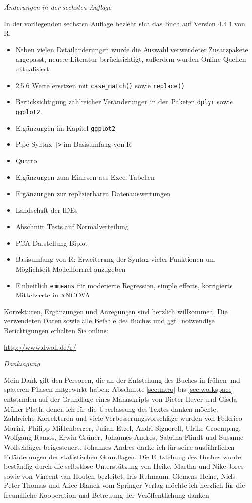 \textit{Änderungen in der sechsten Auflage}

In der vorliegenden sechsten Auflage bezieht sich das Buch auf Version 4.4.1 von R. 
\begin{itemize}
\item Neben vielen Detailänderungen wurde die Auswahl verwendeter Zusatzpakete angepasst, neuere Literatur berücksichtigt, außerdem wurden Online-Quellen aktualisiert.
\item 2.5.6 Werte ersetzen mit \lstinline!case_match()! sowie \lstinline!replace()!
\item Berücksichtigung zahlreicher Veränderungen in den Paketen \lstinline!dplyr! sowie \lstinline!ggplot2!.
\item Ergänzungen im Kapitel \lstinline!ggplot2!
\item Pipe-Syntax \lstinline!|>! im Basisumfang von R
\item Quarto
\item Ergänzungen zum Einlesen aus Excel-Tabellen
\item Ergänzungen zur replizierbaren Datenauswertungen
\item Landschaft der IDEs
\item Abschnitt Tests auf Normalverteilung
\item PCA Darstellung Biplot
\item Basisumfang von R: Erweiterung der Syntax vieler Funktionen um Möglichkeit Modellformel anzugeben
\item Einheitlich \lstinline!emmeans! für moderierte Regression, simple effects, korrigierte Mittelwerte in ANCOVA
\end{itemize}

Korrekturen, Ergänzungen und Anregungen sind herzlich willkommen. Die verwendeten Daten sowie alle Befehle des Buches und ggf.\ notwendige Berichtigungen erhalten Sie online:

\url{http://www.dwoll.de/r/}

\textit{Danksagung}

Mein Dank gilt den Personen, die an der Entstehung des Buches in frühen und späteren Phasen mitgewirkt haben: Abschnitte \ref{sec:intro} bis \ref{sec:workspace} entstanden auf der Grundlage eines Manuskripts von Dieter Heyer und Gisela Müller-Plath, denen ich für die Überlassung des Textes danken möchte. Zahlreiche Korrekturen und viele Verbesserungsvorschläge wurden von Federico Marini, Philipp Mildenberger, Julian Etzel, Andri Signorell, Ulrike Groemping, Wolfgang Ramos, Erwin Grüner, Johannes Andres, Sabrina Flindt und Susanne Wollschläger beigesteuert. Johannes Andres danke ich für seine ausführlichen Erläuterungen der statistischen Grundlagen. Die Entstehung des Buches wurde beständig durch die selbstlose Unterstützung von Heike, Martha und Nike Jores sowie von Vincent van Houten begleitet. Iris Ruhmann, Clemens Heine, Niels Peter Thomas und Alice Blanck vom Springer Verlag möchte ich herzlich für die freundliche Kooperation und Betreuung der Veröffentlichung danken.

